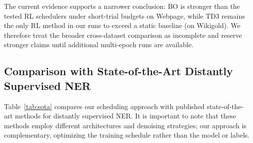 \documentclass[11pt]{article}
\begin{document}
The current evidence supports a narrower conclusion: BO is stronger than the tested RL schedulers under short-trial budgets on Webpage, while TD3 remains the only RL method in our runs to exceed a static baseline (on Wikigold). We therefore treat the broader cross-dataset comparison as incomplete and reserve stronger claims until additional multi-epoch runs are available.

\subsection{Comparison with State-of-the-Art Distantly Supervised NER}

Table~\ref{tab:sota} compares our scheduling approach with published state-of-the-art methods for distantly supervised NER. It is important to note that these methods employ different architectures and denoising strategies; our approach is complementary, optimizing the training schedule rather than the model or labels.
\end{document}
